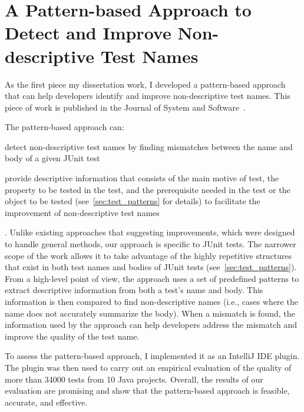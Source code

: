 \section{A Pattern-based Approach to Detect and Improve Non-descriptive Test Names}
\label{sec:test-pattern-section}

As the first piece my dissertation work, I developed a pattern-based approach that can help developers identify and improve non-descriptive test names.
%
This piece of work is published in the Journal of System and Software~\cite{wu2020pattern}.


The pattern-based approach can:
\begin{enumerate*}
\item detect non-descriptive test names by finding mismatches between the name and body of a given JUnit test
\item provide descriptive information that consists of the main motive of test, the property to be tested in the test, and the prerequisite needed in the test or the object to be tested (see~\cref{sec:test_patterns} for details) to facilitate the improvement of non-descriptive test names
\end{enumerate*}.
%
Unlike existing approaches that suggesting improvements, which were designed to handle general methods, our approach is specific to JUnit tests.
The narrower scope of the work allows it to take advantage of the highly repetitive structures that exist in both test names and bodies of JUnit tests (see~\cref{sec:test_patterns}).
%
From a high-level point of view, the approach uses a set of predefined patterns to extract descriptive information from both a test's name and body.
%
This information is then compared to find non-descriptive names (i.e., cases where the name does not accurately summarize the body).
%
When a mismatch is found, the information used by the approach can help developers address the mismatch and improve the quality of the test name.


To assess the pattern-based approach, I implemented it as an IntelliJ IDE plugin.
%
The plugin was then used to carry out an empirical evaluation of the quality of more than \num{34000} tests from \num{10} Java projects.
%
Overall, the results of our evaluation are promising and show that the pattern-based approach is feasible, accurate, and effective.



